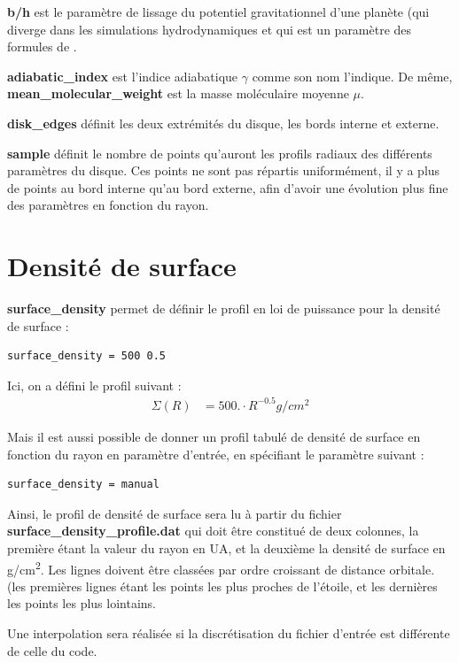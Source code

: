\textbf{b/h} est le paramètre de lissage du potentiel gravitationnel d'une planète (qui diverge dans les simulations hydrodynamiques et qui est un paramètre des formules de \cite{paardekooper2011torque}.

\textbf{adiabatic\_index} est l'indice adiabatique $\gamma$ comme son nom l'indique. De même, \textbf{mean\_molecular\_weight} est la masse moléculaire moyenne $\mu$.

\textbf{disk\_edges} définit les deux extrémités du disque, les bords interne et externe.

\textbf{sample} définit le nombre de points qu'auront les profils radiaux des différents paramètres du disque. Ces points ne sont pas répartis uniformément, il y a plus de points au bord interne qu'au bord externe, afin d'avoir une évolution plus fine des paramètres en fonction du rayon.

\section{Densité de surface}
\textbf{surface\_density} permet de définir le profil en loi de puissance pour la densité de surface : 
\begin{verbatim}
surface_density = 500 0.5
\end{verbatim}
Ici, on a défini le profil suivant : 
\begin{align*}
\Sigma(R) &= 500. \cdot R^{-0.5} \unit{g/cm^2}
\end{align*}

Mais il est aussi possible de donner un profil tabulé de densité de surface en fonction du rayon en paramètre d'entrée, en spécifiant le paramètre suivant : 
\begin{verbatim}
surface_density = manual
\end{verbatim}
Ainsi, le profil de densité de surface sera lu à partir du fichier \textbf{surface\_density\_profile.dat} qui doit être constitué de deux colonnes, la première étant la valeur du rayon en \unit{UA}, et la deuxième la densité de surface en \unit{g/cm^2}. Les lignes doivent être classées par ordre croissant de distance orbitale. (les premières lignes étant les points les plus proches de l'étoile, et les dernières les points les plus lointains. 

\begin{remarque}
Une interpolation sera réalisée si la discrétisation du fichier d'entrée est différente de celle du code.
\end{remarque}

